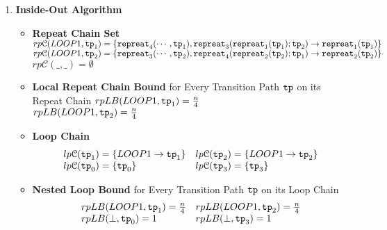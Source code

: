 \begin{enumerate}
    \item \textbf{Inside-Out Algorithm}
    \begin{itemize}
      \item \textbf{Repeat Chain Set}
      \\
      $rp\mathcal{C}(LOOP1, \mathtt{tp}_1) = \{\mathtt{repreat}_4(\cdots, \mathtt{tp}_1), \mathtt{repreat}_3(\mathtt{repreat}_1(\mathtt{tp}_1); \mathtt{tp}_2) \to \mathtt{repreat}_1(\mathtt{tp}_1)\}$ \\
      $rp\mathcal{C}(LOOP1, \mathtt{tp}_2) = \{\mathtt{repreat}_3(\cdots, \mathtt{tp}_2), \mathtt{repreat}_4(\mathtt{repreat}_2(\mathtt{tp}_2); \mathtt{tp}_1) \to \mathtt{repreat}_2(\mathtt{tp}_2)\}$ \\
      $rp\mathcal{C}(\_, \_) = \emptyset$ 
      \item \textbf{{Local Repeat Chain Bound} }for Every Transition Path $\mathtt{tp}$ on its Repeat Chain
      $rpLB(LOOP1, \mathtt{tp}_1) = \frac{n}{4}$ \\
      $rpLB(LOOP1, \mathtt{tp}_2) = \frac{n}{4}$ 
      \item \textbf{Loop Chain}
      \[
        \begin{array}{ll}
          lp\mathcal{C}(\mathtt{tp}_1) = \{LOOP1\to \mathtt{tp}_1\}
          &
          lp\mathcal{C}(\mathtt{tp}_2) = \{LOOP1\to \mathtt{tp}_2\}
          \\
          lp\mathcal{C}(\mathtt{tp}_0) = \{\mathtt{tp}_0\}
          &
          lp\mathcal{C}(\mathtt{tp}_3) = \{\mathtt{tp}_3\}
        \end{array}
        \]
      \item \textbf{Nested Loop Bound }for Every Transition Path $\mathtt{tp}$ on its Loop Chain
      \[
        \begin{array}{ll}
          rpLB(LOOP1, \mathtt{tp}_1) = \frac{n}{4}
          &
          rpLB(LOOP1, \mathtt{tp}_2) = \frac{n}{4}
          \\
          rpLB(\bot, \mathtt{tp}_0) = 1
          &
          rpLB(\bot, \mathtt{tp}_3) = 1
        \end{array}
        \]

\end{itemize}
\end{enumerate}
